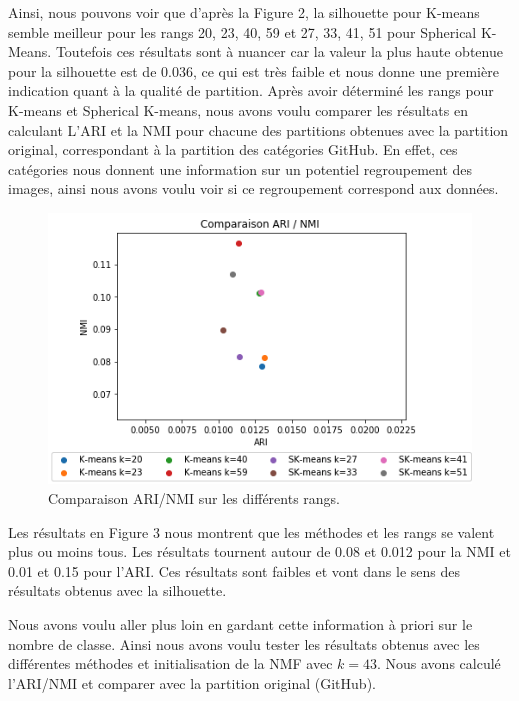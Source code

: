 \documentclass[runningheads]{llncs}
\begin{document}
Ainsi, nous pouvons voir que d'après la Figure 2, la silhouette pour K-means semble meilleur pour les rangs 20, 23, 40, 59 et 27, 33, 41, 51 pour Spherical K-Means. Toutefois ces résultats sont à nuancer car la valeur la plus haute obtenue pour la silhouette est de 0.036, ce qui est très faible et nous donne une première indication quant à la qualité de partition.
Après avoir déterminé les rangs pour K-means et Spherical K-means, nous avons voulu comparer les résultats en calculant L'ARI et la NMI pour chacune des partitions obtenues avec la partition original, correspondant à la partition des catégories GitHub. En effet, ces catégories nous donnent une information sur un potentiel regroupement des images, ainsi nous avons voulu voir si ce regroupement correspond aux données.

\begin{figure}[H]
\centering
\includegraphics[width=1\textwidth]{clustering-comparaison.png}
\caption{Comparaison ARI/NMI sur les différents rangs.}
  \label{fig:clust-comp}
\end{figure}

Les résultats en Figure 3 nous montrent que les méthodes et les rangs se valent plus ou moins tous. Les résultats tournent autour de 0.08 et 0.012 pour la NMI et 0.01 et 0.15 pour l'ARI. Ces résultats sont faibles et vont dans le sens des résultats obtenus avec la silhouette.

Nous avons voulu aller plus loin en gardant cette information à priori sur le nombre de classe. Ainsi nous avons voulu tester les résultats obtenus avec les différentes méthodes et initialisation de la NMF avec $k = 43$. Nous avons calculé l'ARI/NMI et comparer avec la partition original (GitHub).
\end{document}

